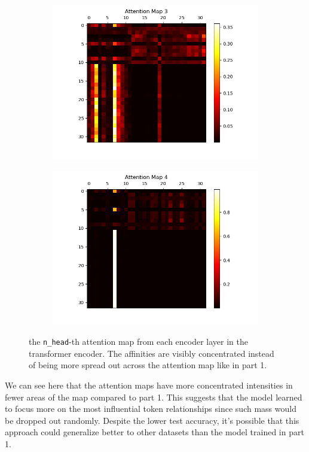 \documentclass[10pt]{article}
\newcommand{\code}[1]{\texttt{#1}}
\theoremstyle{definition}
\begin{document}
\begin{figure}[H]
\begin{subfigure}[b]{0.35\textwidth}
    \end{subfigure}
    \begin{subfigure}[b]{0.35\textwidth}
        \centering
        \includegraphics[scale=0.4]{../data/plots/part3/attention_map_3.png}
        \label{subfig:am3}
    \end{subfigure}
    \begin{subfigure}[b]{0.35\textwidth}
        \centering
        \includegraphics[scale=0.4]{../data/plots/part3/attention_map_4.png}
        \label{subfig:am4}
    \end{subfigure}
\caption{the \code{n\_head}-th attention map from each encoder layer in the transformer encoder. The affinities are visibly concentrated instead of being more spread out across the attention map like in part 1.}
\end{figure}
\noindent We can see here that the attention maps have more concentrated intensities in fewer areas of the map compared to part 1. This suggests that the model learned to focus more on the most influential token relationships since such mass would be dropped out randomly. Despite the lower test accuracy, it's possible that this approach could generalize better to other datasets than the model trained in part 1.



\end{document}
